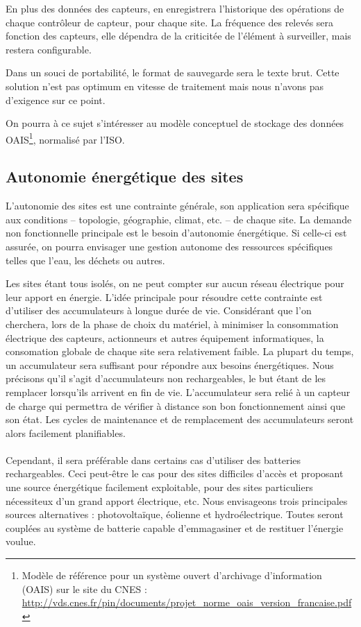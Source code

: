 \documentclass[a4paper, 11pt]{article}
\begin{document}
En plus des données des capteurs, en enregistrera l'historique des opérations de chaque contrôleur de capteur, pour chaque site. La fréquence des relevés sera fonction des capteurs, elle dépendra de la criticitée de l'élément à surveiller, mais restera configurable.

Dans un souci de portabilité, le format de sauvegarde sera le texte brut. Cette solution n'est pas optimum en vitesse de traitement mais nous n'avons pas d'exigence sur ce point.

On pourra à ce sujet s'intéresser au modèle conceptuel de stockage des données OAIS\footnote{Modèle de référence pour un système ouvert d'archivage d'information (OAIS)
sur le site du CNES : \url{http://vds.cnes.fr/pin/documents/projet_norme_oais_version_francaise.pdf}}, normalisé par l'ISO.

\subsection{Autonomie énergétique des sites}

L'autonomie des sites est une contrainte générale, son application sera spécifique aux conditions -- topologie, géographie, climat, etc. -- de chaque site. La demande non fonctionnelle principale est le besoin d'autonomie énergétique. Si celle-ci est assurée, on pourra envisager une gestion autonome des ressources spécifiques telles que l'eau, les déchets ou autres.

Les sites étant tous isolés, on ne peut compter sur aucun réseau électrique pour leur apport en énergie. L'idée principale pour résoudre cette contrainte est d'utiliser des accumulateurs à longue durée de vie. Considérant que l'on cherchera, lors de la phase de choix du matériel, à minimiser la consommation électrique des capteurs, actionneurs et autres équipement informatiques, la consomation globale de chaque site sera relativement faible. La plupart du temps, un accumulateur sera suffisant pour répondre aux besoins énergétiques. Nous précisons qu'il s'agit d'accumulateurs non rechargeables, le but étant de les remplacer lorsqu'ils arrivent en fin de vie. L'accumulateur sera relié à un capteur de charge qui permettra de vérifier à distance son bon fonctionnement ainsi que son état. Les cycles de maintenance et de remplacement des accumulateurs seront alors facilement planifiables.

\paragraph{}
Cependant, il sera préférable dans certains cas d'utiliser des batteries rechargeables. Ceci peut-être le cas pour des sites difficiles d'accès et proposant une source énergétique facilement exploitable, pour des sites particuliers nécessiteux d'un grand apport électrique, etc. Nous envisageons trois principales sources alternatives : photovoltaïque, éolienne et hydroélectrique. Toutes seront couplées au système de batterie capable d'emmagasiner et de restituer l'énergie voulue.
\end{document}
